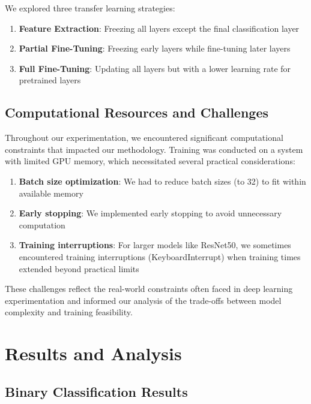 \documentclass[
]{article}
\providecommand{\tightlist}{%
  \setlength{\itemsep}{0pt}\setlength{\parskip}{0pt}}\usepackage{longtable,booktabs,array}
\begin{document}
We explored three transfer learning strategies:

\begin{enumerate}
\def\labelenumi{\arabic{enumi}.}
\tightlist
\item
  \textbf{Feature Extraction}: Freezing all layers except the final
  classification layer
\item
  \textbf{Partial Fine-Tuning}: Freezing early layers while fine-tuning
  later layers
\item
  \textbf{Full Fine-Tuning}: Updating all layers but with a lower
  learning rate for pretrained layers
\end{enumerate}

\subsection{Computational Resources and
Challenges}\label{computational-resources-and-challenges}

Throughout our experimentation, we encountered significant computational
constraints that impacted our methodology. Training was conducted on a
system with limited GPU memory, which necessitated several practical
considerations:

\begin{enumerate}
\def\labelenumi{\arabic{enumi}.}
\tightlist
\item
  \textbf{Batch size optimization}: We had to reduce batch sizes (to 32)
  to fit within available memory
\item
  \textbf{Early stopping}: We implemented early stopping to avoid
  unnecessary computation
\item
  \textbf{Training interruptions}: For larger models like ResNet50, we
  sometimes encountered training interruptions (KeyboardInterrupt) when
  training times extended beyond practical limits
\end{enumerate}

These challenges reflect the real-world constraints often faced in deep
learning experimentation and informed our analysis of the trade-offs
between model complexity and training feasibility.

\section{Results and Analysis}\label{results-and-analysis}

\subsection{Binary Classification
Results}\label{binary-classification-results}
\end{document}
